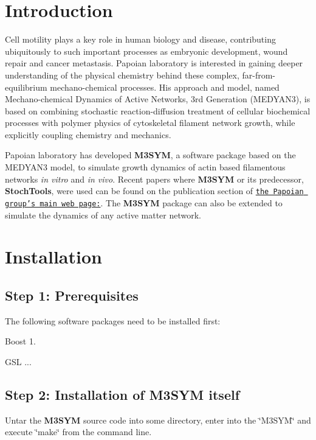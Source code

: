 \hypertarget{index_intro_sec}{}\section{Introduction}\label{index_intro_sec}
Cell motility plays a key role in human biology and disease, contributing ubiquitously to such important processes as embryonic development, wound repair and cancer metastasis. Papoian laboratory is interested in gaining deeper understanding of the physical chemistry behind these complex, far-\/from-\/equilibrium mechano-\/chemical processes. His approach and model, named Mechano-\/chemical Dynamics of Active Networks, 3rd Generation (M\+E\+D\+Y\+A\+N3), is based on combining stochastic reaction-\/diffusion treatment of cellular biochemical processes with polymer physics of cytoskeletal filament network growth, while explicitly coupling chemistry and mechanics.

Papoian laboratory has developed {\bfseries M3\+S\+Y\+M}, a software package based on the M\+E\+D\+Y\+A\+N3 model, to simulate growth dynamics of actin based filamentous networks {\itshape in vitro} and {\itshape in vivo}. Recent papers where {\bfseries M3\+S\+Y\+M} or its predecessor, {\bfseries Stoch\+Tools}, were used can be found on the publication section of \href{http://papoian.chem.umd.edu/}{\tt the Papoian group's main web page\+:}. The {\bfseries M3\+S\+Y\+M} package can also be extended to simulate the dynamics of any active matter network.\hypertarget{index_install_sec}{}\section{Installation}\label{index_install_sec}
\hypertarget{index_step1}{}\subsection{Step 1\+: Prerequisites}\label{index_step1}
The following software packages need to be installed first\+:


\begin{DoxyItemize}
\item Boost 1.
\item G\+S\+L ...
\end{DoxyItemize}\hypertarget{index_step2}{}\subsection{Step 2\+: Installation of M3\+S\+Y\+M itself}\label{index_step2}
Untar the {\bfseries M3\+S\+Y\+M} source code into some directory, enter into the \char`\"{}\+M3\+S\+Y\+M\char`\"{} and execute \char`\"{}make\char`\"{} from the command line. 